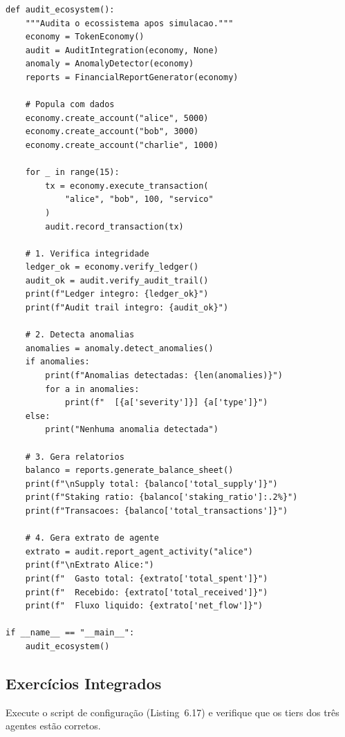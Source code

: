 \begin{lstlisting}[caption={Auditoria completa do ecossistema},
                  label={lst:auditagem}]
def audit_ecosystem():
    """Audita o ecossistema apos simulacao."""
    economy = TokenEconomy()
    audit = AuditIntegration(economy, None)
    anomaly = AnomalyDetector(economy)
    reports = FinancialReportGenerator(economy)

    # Popula com dados
    economy.create_account("alice", 5000)
    economy.create_account("bob", 3000)
    economy.create_account("charlie", 1000)

    for _ in range(15):
        tx = economy.execute_transaction(
            "alice", "bob", 100, "servico"
        )
        audit.record_transaction(tx)

    # 1. Verifica integridade
    ledger_ok = economy.verify_ledger()
    audit_ok = audit.verify_audit_trail()
    print(f"Ledger integro: {ledger_ok}")
    print(f"Audit trail integro: {audit_ok}")

    # 2. Detecta anomalias
    anomalies = anomaly.detect_anomalies()
    if anomalies:
        print(f"Anomalias detectadas: {len(anomalies)}")
        for a in anomalies:
            print(f"  [{a['severity']}] {a['type']}")
    else:
        print("Nenhuma anomalia detectada")

    # 3. Gera relatorios
    balanco = reports.generate_balance_sheet()
    print(f"\nSupply total: {balanco['total_supply']}")
    print(f"Staking ratio: {balanco['staking_ratio']:.2%}")
    print(f"Transacoes: {balanco['total_transactions']}")

    # 4. Gera extrato de agente
    extrato = audit.report_agent_activity("alice")
    print(f"\nExtrato Alice:")
    print(f"  Gasto total: {extrato['total_spent']}")
    print(f"  Recebido: {extrato['total_received']}")
    print(f"  Fluxo liquido: {extrato['net_flow']}")

if __name__ == "__main__":
    audit_ecosystem()
\end{lstlisting}

\subsection{Exercícios Integrados}

\begin{exercicio}[Nivel 0]
Execute o script de configuração (Listing~6.17) e verifique que
os tiers dos três agentes estão corretos.
\end{exercicio}

